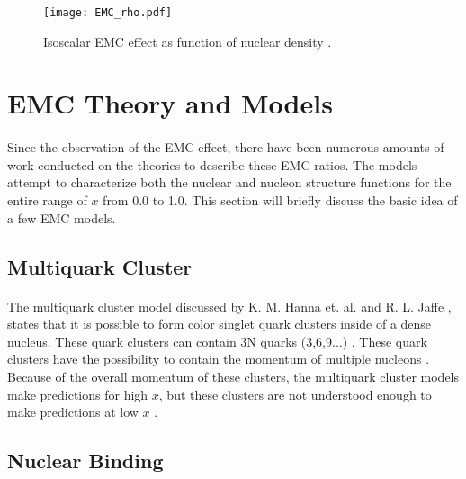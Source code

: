 \iffalse
\begin{figure}[h]
	\centering
	\texttt{[image: He3\_EMC\_seely.pdf]} 
	\caption{EMC ratio for He3, Blue points are corrected for proton excess\cite{seeley}.}
	\label{EMCHe3_Seely}
\end{figure} 
\fi

\begin{figure}[t]
	\centering
	\texttt{[image: EMC\_rho.pdf]} 
	\caption{Isoscalar EMC effect as function of nuclear density \cite{seeley}.}
	\label{EMCrho}
\end{figure} 

\section{EMC Theory and Models}
\paragraph{}Since the observation of the EMC effect, there have been numerous amounts of work conducted on the theories to describe these EMC ratios. The models attempt to characterize both the nuclear and nucleon structure functions for the entire range of $x$ from 0.0 to 1.0. This section will briefly discuss the basic idea of a few EMC models.
\subsection{Multiquark Cluster}
\paragraph{} The multiquark cluster model discussed by K. M. Hanna et. al. \cite{EMC_multiQ} and R. L. Jaffe \cite{EMC_multiQ_2}, states that it is possible to form color singlet quark clusters inside of a dense nucleus. These quark clusters can contain 3N quarks (3,6,9...) \cite{Norton}. These quark clusters have the possibility to contain the momentum of multiple nucleons \cite{Ajth}. Because of the overall momentum of these clusters, the multiquark cluster models make predictions for high $x $, but these clusters are not understood enough to make predictions at low $x$ \cite{ EMC_model_1,Geesaman,  Ajth,EMC_multiQ}.  

\subsection{Nuclear Binding}
